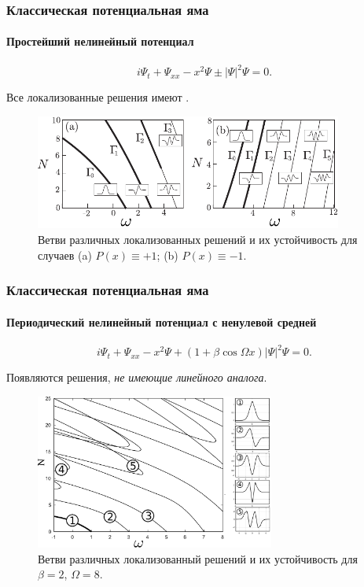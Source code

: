 \documentclass{beamer}
\begin{document}
\begin{frame}
	\frametitle{Классическая потенциальная яма}
	\framesubtitle{Простейший нелинейный потенциал\footnotemark[7]}
	
	\begin{equation}
		i \Psi_t + \Psi_{xx} - x^2 \Psi \pm |\Psi|^2 \Psi = 0.
	\end{equation}
	
	Все локализованные решения имеют {\it {}}.
	
	\begin{figure}
		\includegraphics[width=0.9\textwidth]{pic/solution_branches_simple.pdf}
		\caption{Ветви различных локализованных решений и их устойчивость для случаев {\color{ceruleanblue} (a)} $P(x) \equiv +1$; {\color{ceruleanblue} (b)} $P(x) \equiv -1$.}
		\label{pic:branches_simple}
	\end{figure}
	
\end{frame}

\begin{frame}
	\frametitle{Классическая потенциальная яма}
	\framesubtitle{Периодический нелинейный потенциал с ненулевой средней}
	
	\begin{equation}
		i \Psi_t + \Psi_{xx} - x^2 \Psi + (1 + \beta \cos \Omega x) |\Psi|^2 \Psi = 0.
	\end{equation}

	Появляются решения, {\it не имеющие линейного аналога}.

	\begin{figure}
		\includegraphics[width=0.7\textwidth]{pic/solution_branches_nonzero_mean.pdf}
		\caption{Ветви различных локализованный решений и их устойчивость для $\beta = 2$, $\Omega = 8$.}
		\label{pic:branches_nonzero_mean}
	\end{figure}	
	
\end{frame}
\end{document}
